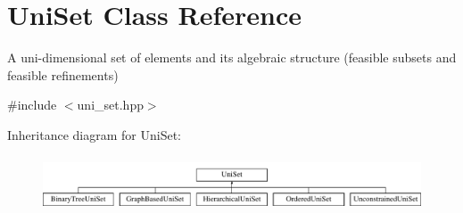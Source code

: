 \hypertarget{classUniSet}{\section{Uni\-Set Class Reference}
\label{classUniSet}
}


A uni-\/dimensional set of elements and its algebraic structure (feasible subsets and feasible refinements)  




{\ttfamily \#include $<$uni\-\_\-set.\-hpp$>$}

Inheritance diagram for Uni\-Set\-:\begin{figure}[H]
\begin{center}
\leavevmode
\includegraphics[height=1.635036cm]{classUniSet}
\end{center}
\end{figure}
